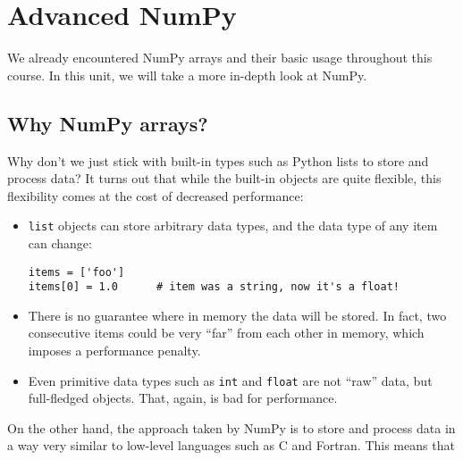 \documentclass{scrartcl}
\begin{document}
    
    \maketitle
    \tableofcontents
    
    

    
    \hypertarget{advanced-numpy}{%
\section{Advanced NumPy}\label{advanced-numpy}}

We already encountered NumPy arrays and their basic usage throughout
this course. In this unit, we will take a more in-depth look at NumPy.

\hypertarget{why-numpy-arrays}{%
\subsection{Why NumPy arrays?}\label{why-numpy-arrays}}

Why don't we just stick with built-in types such as Python lists to
store and process data? It turns out that while the built-in objects are
quite flexible, this flexibility comes at the cost of decreased
performance:

\begin{itemize}
\item
  \texttt{list} objects can store arbitrary data types, and the data
  type of any item can change:

\begin{verbatim}
items = ['foo']
items[0] = 1.0      # item was a string, now it's a float!
\end{verbatim}
\item
  There is no guarantee where in memory the data will be stored. In
  fact, two consecutive items could be very ``far'' from each other in
  memory, which imposes a performance penalty.
\item
  Even primitive data types such as \texttt{int} and \texttt{float} are
  not ``raw'' data, but full-fledged objects. That, again, is bad for
  performance.
\end{itemize}

On the other hand, the approach taken by NumPy is to store and process
data in a way very similar to low-level languages such as C and Fortran.
This means that
\end{document}
